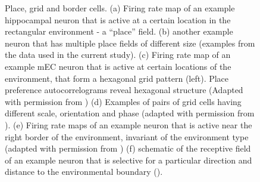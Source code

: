 \begin{figure}
\captionsetup{format=plain}
\caption[Place cells]{
Place, grid and border cells. (a) Firing rate map of an example hippocampal neuron that is active at a certain location in the rectangular environment - a “place” field. (b) another example neuron that has multiple place fields of different size (examples from the data used in the current study). (c) Firing rate map of an example mEC neuron that is active at certain locations of the environment, that form a hexagonal grid pattern (left). Place preference autocorrelograms reveal hexagonal structure (Adapted with permission from \cite{Moser2015}) (d) Examples of pairs of grid cells having different scale, orientation and phase (adapted with permission from \cite{Moser2014}). (e) Firing rate maps of an example neuron that is active near the right border of the environment, invariant of the environment type (adapted with permission from \cite{Solstad2008}) (f) schematic of the receptive field of an example neuron that is selective for a particular direction and distance to the environmental boundary (\cite{Lever2009}).
}
\label{fig:F1_place_cells}
\end{figure}


